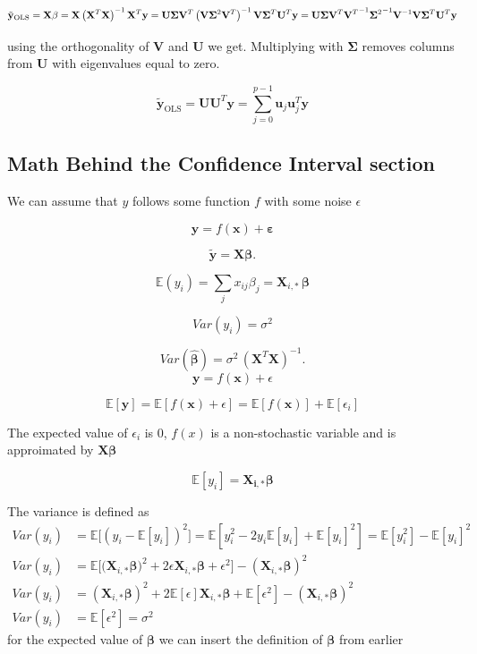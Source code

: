 \documentclass[twoside,11pt]{report}
\begin{document}
$$
\tilde{\mathbf{y}}_{\mathrm{OLS}} = \mathbf{X}\mathbf{\beta} = \mathbf{X} \left(\mathbf{X}^T \mathbf{X}\right)^{-1} \mathbf{X}^T \mathbf{y}
\\ = \mathbf{U}\mathbf{\Sigma}\mathbf{V}^T \left( \mathbf{V}\mathbf{\Sigma}^2\mathbf{V}^T \right)^{-1} \mathbf{V}\mathbf{\Sigma}^T\mathbf{U}^T \mathbf{y}
\\ = \mathbf{U}\mathbf{\Sigma}\mathbf{V}^T {\mathbf{V}^T}^{-1} {\mathbf{\Sigma}^2}^{-1} \mathbf{V}^{-1}  \mathbf{V}\mathbf{\Sigma}^T\mathbf{U}^T \mathbf{y}
$$

using the orthogonality of $\mathbf{V}$ and $\mathbf{U}$ we get. Multiplying with $\mathbf{\Sigma}$ removes columns from $\mathbf{U}$ with eigenvalues equal to zero.

$$
\tilde{\mathbf{y}}_{\mathrm{OLS}} = \mathbf{U}\mathbf{U}^T \mathbf{y}= \sum_{j=0}^{p-1}\mathbf{u}_j\mathbf{u}_j^T\mathbf{y}
$$




%
\subsection*{Math Behind the Confidence Interval section}
\label{app:confidenceInterval}
We can assume that $y$ follows some function $f$ with some noise $\epsilon$

$$
\mathbf{y} = f(\mathbf{x})+\mathbf{\varepsilon}
$$

$$
\mathbf{\tilde{y}} = \mathbf{X}\mathbf{\beta}.
$$

$$
\mathbb{E}(y_i)  =\sum_{j}x_{ij} \beta_j=\mathbf{X}_{i, \ast} \, \mathbf{\beta}
$$

$$
{Var}(y_i)  = \sigma^2
$$

$$
{Var}(\mathbf{\hat{\beta}}) = \sigma^2 \, (\mathbf{X}^{T} \mathbf{X})^{-1}.
$$
$$
\mathbf{y} = f(\mathbf{x}) + \epsilon
$$

$$
\mathbb{E}[\mathbf{y}] = \mathbb{E}[f(\mathbf{x} )+ \epsilon] = \mathbb{E}[f(\mathbf{x})] + \mathbb{E}[\epsilon_i]
$$

The expected value of $\epsilon_i$ is $0$, $f(x)$ is a non-stochastic variable and is approimated by $\mathbf{X}\mathbf{\beta}$

$$
\mathbb{E}[y_i] = \mathbf{X_{i,*}}\mathbf{\beta}
$$

The variance is defined as
\begin{align*}
Var(y_i) &= \mathbb{E}\big[(y_i - \mathbb{E}[y_i])^2\big] = \mathbb{E}\left[y_i^2 - 2y_i\mathbb{E}[y_i] + \mathbb{E}[y_i]^2\right] = \mathbb{E}[y_i^2] - \mathbb{E}[y_i]^2\\
Var(y_i) &= \mathbb{E}\big[\big(\mathbf{X}_{i,*}\mathbf{\beta}\big)^2 + 2\epsilon \mathbf{X}_{i,*}\mathbf{\beta} + \epsilon^2 \big] - (\mathbf{X}_{i,*}\mathbf{\beta})^2\\
Var(y_i) &= (\mathbf{X}_{i,*}\mathbf{\beta})^2 + 2\mathbb{E}[\epsilon]\mathbf{X}_{i,*}\mathbf{\beta} + \mathbb{E}[\epsilon^2] - (\mathbf{X}_{i,*}\mathbf{\beta})^2\\
Var(y_i) &= \mathbb{E}[\epsilon^2] = \sigma^2
\end{align*}
for the expected value of $\mathbf{\beta}$ we can insert the definition of $\mathbf{\beta}$ from earlier
\end{document}
